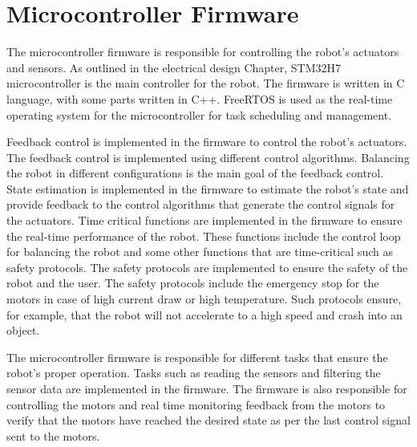 \section{Microcontroller Firmware}
The microcontroller firmware is responsible for controlling the robot's actuators and sensors.
As outlined in the electrical design Chapter, STM32H7 microcontroller is the main controller for the robot.
The firmware is written in C language, with some parts written in C++.
FreeRTOS is used as the real-time operating system for the microcontroller for task scheduling and management.


Feedback control is implemented in the firmware to control the robot's actuators.
The feedback control is implemented using different control algorithms.
Balancing the robot in different configurations is the main goal of the feedback control.
State estimation is implemented in the firmware to estimate the robot's state and provide feedback to the control algorithms that generate the control signals for the actuators.
Time critical functions are implemented in the firmware to ensure the real-time performance of the robot.
These functions include the control loop for balancing the robot and some other functions that are time-critical such as safety protocols.
The safety protocols are implemented to ensure the safety of the robot and the user.
The safety protocols include the emergency stop for the motors in case of high current draw or high temperature.
Such protocols ensure, for example, that the robot will not accelerate to a high speed and crash into an object.

The microcontroller firmware is responsible for different tasks that ensure the robot's proper operation.
Tasks such as reading the sensors and filtering the sensor data are implemented in the firmware.
The firmware is also responsible for controlling the motors and real time monitoring feedback from the motors to verify that the motors have reached the desired state as per the last control signal sent to the motors.


